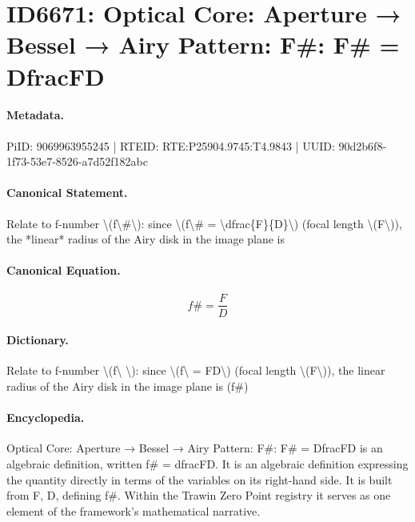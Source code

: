 \section*{ID6671: Optical Core: Aperture → Bessel → Airy Pattern: F\#: F\# = DfracFD}
\paragraph{Metadata.}
PiID: 9069963955245 | RTEID: RTE:P25904.9745:T4.9843 | UUID: 90d2b6f8-1f73-53e7-8526-a7d52f182abc

\paragraph{Canonical Statement.}
Relate to f-number \textbackslash{}(f\textbackslash{}\#\textbackslash{}): since \textbackslash{}(f\textbackslash{}\# = \textbackslash{}dfrac\{F\}\{D\}\textbackslash{}) (focal length \textbackslash{}(F\textbackslash{})), the *linear* radius of the Airy disk in the image plane is

\paragraph{Canonical Equation.}
\[
f\# = \dfrac{F}{D}
\]

\paragraph{Dictionary.}
Relate to f-number \textbackslash{}(f\textbackslash{} \textbackslash{}): since \textbackslash{}(f\textbackslash{} = FD\textbackslash{}) (focal length \textbackslash{}(F\textbackslash{})), the linear radius of the Airy disk in the image plane is (f\#)

\paragraph{Encyclopedia.}
Optical Core: Aperture → Bessel → Airy Pattern: F\#: F\# = DfracFD is an algebraic definition, written f\# = dfracFD. It is an algebraic definition expressing the quantity directly in terms of the variables on its right-hand side. It is built from F, D, defining f\#. Within the Trawin Zero Point registry it serves as one element of the framework's mathematical narrative.
